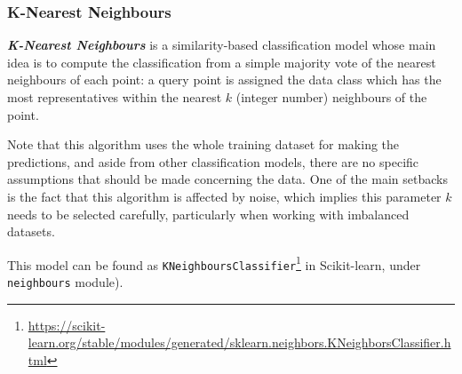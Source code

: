 \documentclass[a4paper, 12pt]{book}
\begin{document}





\subsubsection{K-Nearest Neighbours}
\label{sssec:knn}

\textbf{\textit{K-Nearest Neighbours}} is a similarity-based classification model whose main idea is to compute the classification from a simple majority vote of the nearest neighbours of each point: a query point is assigned the data class which has the most representatives within the nearest $k$ (integer number) neighbours of the point.

Note that this algorithm uses the whole training dataset for making the predictions, and aside from other classification models, there are no specific assumptions that should be made concerning the data. One of the main setbacks is the fact that this algorithm is affected by noise, which implies this parameter $k$ needs to be selected carefully, particularly when working with imbalanced datasets.

This model can be found as \texttt{KNeighboursClassifier}\footnote{\url{https://scikit-learn.org/stable/modules/generated/sklearn.neighbors.KNeighborsClassifier.html}} in Scikit-learn, under \texttt{neighbours} module).
\end{document}
